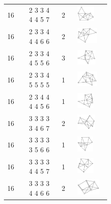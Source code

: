 \begin{footnotesize}
\begin{longtable}{m{0.07\linewidth} m{0.15\linewidth} m{0.05\linewidth} m{0.15\linewidth}}
16 & 2 3 3 4 4 4 5 7 & 2 & \includegraphics[height=0.8cm]{15-universal-graphs/img/degree-sequences-example-graphs/graph-4-8-142}\\
16 & 2 3 3 4 4 4 6 6 & 2 & \includegraphics[height=0.8cm]{15-universal-graphs/img/degree-sequences-example-graphs/graph-4-8-143}\\
16 & 2 3 3 4 4 5 5 6 & 3 & \includegraphics[height=0.8cm]{15-universal-graphs/img/degree-sequences-example-graphs/graph-4-8-144}\\
16 & 2 3 3 4 5 5 5 5 & 1 & \includegraphics[height=0.8cm]{15-universal-graphs/img/degree-sequences-example-graphs/graph-4-8-145}\\
16 & 2 3 4 4 4 4 5 6 & 1 & \includegraphics[height=0.8cm]{15-universal-graphs/img/degree-sequences-example-graphs/graph-4-8-146}\\
16 & 3 3 3 3 3 4 6 7 & 2 & \includegraphics[height=0.8cm]{15-universal-graphs/img/degree-sequences-example-graphs/graph-4-8-147}\\
16 & 3 3 3 3 3 5 6 6 & 1 & \includegraphics[height=0.8cm]{15-universal-graphs/img/degree-sequences-example-graphs/graph-4-8-148}\\
16 & 3 3 3 3 4 4 5 7 & 1 & \includegraphics[height=0.8cm]{15-universal-graphs/img/degree-sequences-example-graphs/graph-4-8-149}\\
16 & 3 3 3 3 4 4 6 6 & 2 & \includegraphics[height=0.8cm]{15-universal-graphs/img/degree-sequences-example-graphs/graph-4-8-150}\\

\end{longtable}
\end{footnotesize}
